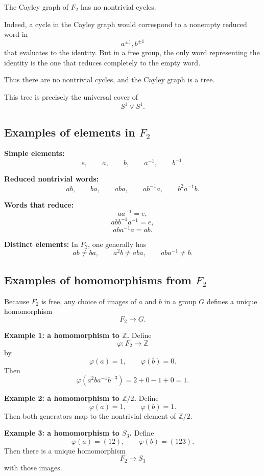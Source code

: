 \documentclass[12pt,a4paper]{article}
\theoremstyle{notespace}
\begin{document}
The Cayley graph of \(F_2\) has no nontrivial cycles.

Indeed, a cycle in the Cayley graph would correspond to a nonempty reduced word in
\[
a^{\pm 1},b^{\pm 1}
\]
that evaluates to the identity. But in a free group, the only word representing the identity is the one that reduces completely to the empty word.

Thus there are no nontrivial cycles, and the Cayley graph is a tree.

This tree is precisely the universal cover of
\[
S^1\vee S^1.
\]

\bigskip

\subsection{ Examples of elements in \texorpdfstring{$F_2$}{F2}}

\textbf{Simple elements:}
\[
e,\qquad a,\qquad b,\qquad a^{-1},\qquad b^{-1}.
\]

\textbf{Reduced nontrivial words:}
\[
ab,\qquad ba,\qquad aba,\qquad ab^{-1}a,\qquad b^2a^{-1}b.
\]

\textbf{Words that reduce:}
\[
aa^{-1}=e,
\]
\[
abb^{-1}a^{-1}=e,
\]
\[
aba^{-1}a=ab.
\]

\textbf{Distinct elements:}
In \(F_2\), one generally has
\[
ab\neq ba,\qquad a^2b\neq aba,\qquad aba^{-1}\neq b.
\]

\bigskip

\subsection{ Examples of homomorphisms from \texorpdfstring{$F_2$}{F2}}

Because \(F_2\) is free, any choice of images of \(a\) and \(b\) in a group \(G\) defines a unique homomorphism
\[
F_2\to G.
\]

\medskip

\textbf{Example 1: a homomorphism to \(\mathbb Z\).}
Define
\[
\varphi:F_2\to \mathbb Z
\]
by
\[
\varphi(a)=1,\qquad \varphi(b)=0.
\]
Then
\[
\varphi(a^2ba^{-1}b^{-3})=2+0-1+0=1.
\]

\medskip

\textbf{Example 2: a homomorphism to \(\mathbb Z/2\).}
Define
\[
\varphi(a)=1,\qquad \varphi(b)=1.
\]
Then both generators map to the nontrivial element of \(\mathbb Z/2\).

\medskip

\textbf{Example 3: a homomorphism to \(S_3\).}
Define
\[
\varphi(a)=(12),\qquad \varphi(b)=(123).
\]
Then there is a unique homomorphism
\[
F_2\to S_3
\]
with those images.
\end{document}

